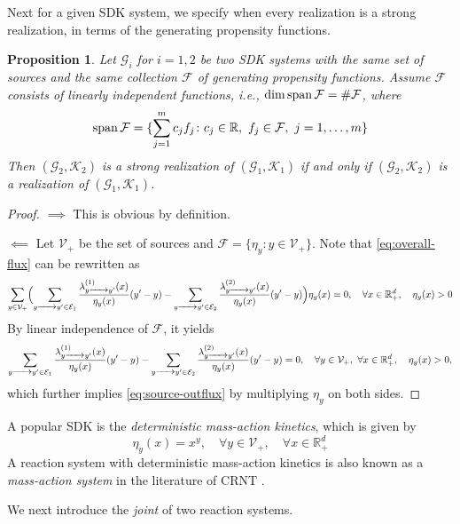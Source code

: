 \documentclass[10pt]{amsart}
\numberwithin{equation}{section}
\theoremstyle{plain}
\newtheorem{proposition}[theorem]{Proposition}
\theoremstyle{definition}
\theoremstyle{remark}
\newcommand{\cE}{\mathcal{E}}
\newcommand{\cF}{\mathcal{F}}
\newcommand{\cG}{\mathcal{G}}
\newcommand{\cK}{\mathcal{K}}
\newcommand{\cV}{\mathcal{V}}
\newcommand{\spa}{{\rm span\,}}
\begin{document}
Next for a given SDK system, we specify when every realization is a strong realization, in terms of the generating propensity functions.
\begin{proposition}\label{prop:linear-independence-realization}
Let  $\cG_i$ for $i=1,2$ be two SDK systems with the same set of sources and the same collection $\cF$ of generating propensity functions. Assume $\cF$ consists of linearly independent functions, i.e., $\dim\spa\cF=\#\cF$, where $$\spa\cF=\{\sum_{j=1}^mc_jf_j\colon c_j\in\mathbb{R},\ f_j\in\cF,\ j=1,\ldots,m\}$$ Then $(\cG_2,\cK_2)$ is a strong realization of $(\cG_1,\cK_1)$ if and only if $(\cG_2,\cK_2)$ is a realization of $(\cG_1,\cK_1)$.
 \end{proposition}
 \begin{proof}
\noindent $\implies$ This is obvious by definition.
\medskip

\noindent $\impliedby$ Let $\cV_+$ be the set of sources and $\cF=\{\eta_y\colon y\in\cV_+\}$. Note that \eqref{eq:overall-flux} can be rewritten as
 \[\sum_{y\in\cV_+}\Bigl(\sum_{y\ce{->[]} y'\in\cE_1}\frac{\lambda^{(1)}_{y\ce{->[]} y'}(x)}{\eta_{y}(x)}(y'-y) -\sum_{y\ce{->[]} y'\in\cE_2}\frac{\lambda^{(2)}_{y\ce{->[]} y'}(x)}{\eta_{y}(x)}(y'-y)\Bigr) \eta_{y}(x)= 0,\quad \forall x\in\mathbb{R}^d_+,\quad \eta_{y}(x)>0\]
 By linear independence of $\cF$, it yields
 \[\sum_{y\ce{->[]} y'\in\cE_1}\frac{\lambda^{(1)}_{y\ce{->[]} y'}(x)}{\eta_{y}(x)}(y'-y) -\sum_{y\ce{->[]} y'\in\cE_2}\frac{\lambda^{(2)}_{y\ce{->[]} y'}(x)}{\eta_{y}(x)}(y'-y)=0,\quad \forall y\in\cV_+,\ \forall x\in\mathbb{R}^d_+,\quad \eta_{y}(x)>0,\]
 which further implies  \eqref{eq:source-outflux} by multiplying $\eta_y$ on both sides.
 \end{proof}


A popular SDK is the \emph{deterministic mass-action kinetics}, which is given by $$\eta_y(x)=x^y,\quad \forall  y\in\cV_+,\quad \forall x\in\mathbb{R}^d_+$$
A reaction system with deterministic mass-action kinetics is also known as a \emph{mass-action system} in the literature of CRNT \cite{H72,F72}.

We next introduce the \emph{joint} of two reaction systems.
\end{document}
